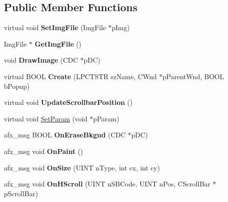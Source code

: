 \subsection*{Public Member Functions}
\begin{DoxyCompactItemize}
\item 
\mbox{\label{class_basic_view_ad48fb56fa9b09b92f541a79c66901cea}} 
virtual void {\bfseries Set\+Img\+File} (Img\+File $\ast$p\+Img)
\item 
\mbox{\label{class_basic_view_a6efb4e96e3f56d57bca547016980e12c}} 
Img\+File $\ast$ {\bfseries Get\+Img\+File} ()
\item 
\mbox{\label{class_basic_view_a4d5fefc55235b1b84bcf6cfe5c9f140d}} 
void {\bfseries Draw\+Image} (C\+DC $\ast$p\+DC)
\item 
\mbox{\label{class_basic_view_a70a63eea47d1e23d50f67c62080e42c5}} 
virtual B\+O\+OL {\bfseries Create} (L\+P\+C\+T\+S\+TR sz\+Name, C\+Wnd $\ast$p\+Parent\+Wnd, B\+O\+OL b\+Popup)
\item 
\mbox{\label{class_basic_view_af13f4ac91b170f02e60f1ff231402ac2}} 
virtual void {\bfseries Update\+Scrollbar\+Position} ()
\item 
virtual void \mbox{\hyperlink{class_basic_view_ab553e969a295d6d6933a7a701ade79bc}{Set\+Param}} (void $\ast$p\+Param)
\item 
\mbox{\label{class_basic_view_a495262f5dc8aa19a66a11f28fd73ca3b}} 
afx\+\_\+msg B\+O\+OL {\bfseries On\+Erase\+Bkgnd} (C\+DC $\ast$p\+DC)
\item 
\mbox{\label{class_basic_view_ae459b872e7b726d8e1c23ad0b7516a08}} 
afx\+\_\+msg void {\bfseries On\+Paint} ()
\item 
\mbox{\label{class_basic_view_a99599b49df57fdb7526d97dd9cbc63dd}} 
afx\+\_\+msg void {\bfseries On\+Size} (U\+I\+NT n\+Type, int cx, int cy)
\item 
\mbox{\label{class_basic_view_a8f9fbf9908c3e133b732fca6048f776a}} 
afx\+\_\+msg void {\bfseries On\+H\+Scroll} (U\+I\+NT n\+S\+B\+Code, U\+I\+NT n\+Pos, C\+Scroll\+Bar $\ast$p\+Scroll\+Bar)

\end{DoxyCompactItemize}
